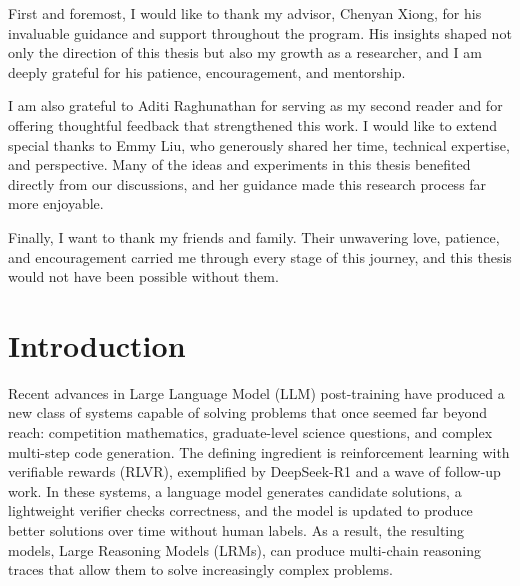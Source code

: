 \documentclass[12pt]{cmuthesis}
\begin{document}
\begin{acknowledgments}
First and foremost, I would like to thank my advisor, Chenyan Xiong, for his invaluable guidance and support throughout the program. His insights shaped not only the direction of this thesis but also my growth as a researcher, and I am deeply grateful for his patience, encouragement, and mentorship.

I am also grateful to Aditi Raghunathan for serving as my second reader and for offering thoughtful feedback that strengthened this work. I would like to extend special thanks to Emmy Liu, who generously shared her time, technical expertise, and perspective. Many of the ideas and experiments in this thesis benefited directly from our discussions, and her guidance made this research process far more enjoyable.

Finally, I want to thank my friends and family. Their unwavering love, patience, and encouragement carried me through every stage of this journey, and this thesis would not have been possible without them.
\end{acknowledgments}



\tableofcontents
\listoffigures
\listoftables

\mainmatter


%
%
%
%
%


\chapter{Introduction}
Recent advances in Large Language Model (LLM) post-training have produced a new class of systems capable of solving problems that once seemed far beyond reach: competition mathematics, graduate-level science questions, and complex multi-step code generation. The defining ingredient is reinforcement learning with verifiable rewards (RLVR), exemplified by DeepSeek-R1 \citep{deepseek-aiDeepSeekR1IncentivizingReasoning2025} and a wave of follow-up work. In these systems, a language model generates candidate solutions, a lightweight verifier checks correctness, and the model is updated to produce better solutions over time without human labels. As a result, the resulting models, Large Reasoning Models (LRMs), can produce multi-chain reasoning traces that allow them to solve increasingly complex problems.
\end{document}

